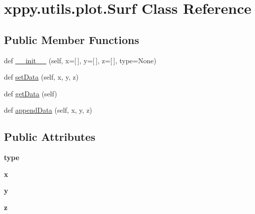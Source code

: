 \hypertarget{classxppy_1_1utils_1_1plot_1_1_surf}{}\section{xppy.\+utils.\+plot.\+Surf Class Reference}
\label{classxppy_1_1utils_1_1plot_1_1_surf}
\subsection*{Public Member Functions}
\begin{DoxyCompactItemize}
\item 
def \mbox{\hyperlink{classxppy_1_1utils_1_1plot_1_1_surf_a54ca551392b81c444f4e512cd4671e0b}{\+\_\+\+\_\+init\+\_\+\+\_\+}} (self, x=\mbox{[}$\,$\mbox{]}, y=\mbox{[}$\,$\mbox{]}, z=\mbox{[}$\,$\mbox{]}, type=None)
\item 
def \mbox{\hyperlink{classxppy_1_1utils_1_1plot_1_1_surf_afffbbdfcae7540bc9f422a22662557bf}{set\+Data}} (self, x, y, z)
\item 
def \mbox{\hyperlink{classxppy_1_1utils_1_1plot_1_1_surf_ac6c49f95f52fa80262260574bb854be3}{get\+Data}} (self)
\item 
def \mbox{\hyperlink{classxppy_1_1utils_1_1plot_1_1_surf_a075b479325937022834920576550daa7}{append\+Data}} (self, x, y, z)
\end{DoxyCompactItemize}
\subsection*{Public Attributes}
\begin{DoxyCompactItemize}
\item 
\mbox{\label{classxppy_1_1utils_1_1plot_1_1_surf_a8cac12a18b16e79ebf6ba1c9468d8cd4}} 
{\bfseries type}
\item 
\mbox{\label{classxppy_1_1utils_1_1plot_1_1_surf_a24245038e9a821d8cd6b2ef4faa99902}} 
{\bfseries x}
\item 
\mbox{\label{classxppy_1_1utils_1_1plot_1_1_surf_aaa174da2c2b75ee89f1c379532c87516}} 
{\bfseries y}
\item 
\mbox{\label{classxppy_1_1utils_1_1plot_1_1_surf_ab551e22e260e4cfe4efc2db98e229e13}} 
{\bfseries z}
\end{DoxyCompactItemize}


